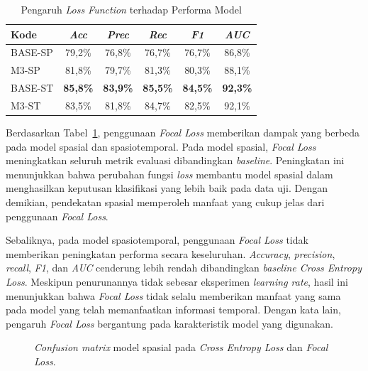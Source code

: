\begin{table}[htbp]
\centering
\caption{Pengaruh \textit{Loss Function} terhadap Performa Model}
\label{table:4.ablation-loss}
\begin{tabular}{lccccc}
\toprule
\textbf{Kode} &
\textbf{\textit{Acc}} &
\textbf{\textit{Prec}} &
\textbf{\textit{Rec}} &
\textbf{\textit{F1}} &
\textbf{\textit{AUC}} \\
\midrule
BASE-SP & 79,2\% & 76,8\% & 76,7\% & 76,7\% & 86,8\% \\
M3-SP & 81,8\% & 79,7\% & 81,3\% & 80,3\% & 88,1\% \\
\midrule
BASE-ST & \textbf{85,8\%} & \textbf{83,9\%} & \textbf{85,5\%} & \textbf{84,5\%} & \textbf{92,3\%} \\
M3-ST & 83,5\% & 81,8\% & 84,7\% & 82,5\% & 92,1\% \\
\bottomrule
\end{tabular}
\end{table}

Berdasarkan Tabel~\ref{table:4.ablation-loss}, penggunaan \textit{Focal Loss} memberikan dampak yang berbeda pada model spasial dan spasiotemporal. Pada model spasial, \textit{Focal Loss} meningkatkan seluruh metrik evaluasi dibandingkan \textit{baseline}. Peningkatan ini menunjukkan bahwa perubahan fungsi \textit{loss} membantu model spasial dalam menghasilkan keputusan klasifikasi yang lebih baik pada data uji. Dengan demikian, pendekatan spasial memperoleh manfaat yang cukup jelas dari penggunaan \textit{Focal Loss}.

Sebaliknya, pada model spasiotemporal, penggunaan \textit{Focal Loss} tidak memberikan peningkatan performa secara keseluruhan. \textit{Accuracy}, \textit{precision}, \textit{recall}, \textit{F1}, dan \textit{AUC} cenderung lebih rendah dibandingkan \textit{baseline Cross Entropy Loss}. Meskipun penurunannya tidak sebesar eksperimen \textit{learning rate}, hasil ini menunjukkan bahwa \textit{Focal Loss} tidak selalu memberikan manfaat yang sama pada model yang telah memanfaatkan informasi temporal. Dengan kata lain, pengaruh \textit{Focal Loss} bergantung pada karakteristik model yang digunakan.

\begin{figure}[htbp]
\centering
{}
\caption{\textit{Confusion matrix} model spasial pada \textit{Cross Entropy Loss} dan \textit{Focal Loss}.}
\label{fig:4.ablation-loss-cm-spatial}
\end{figure}


